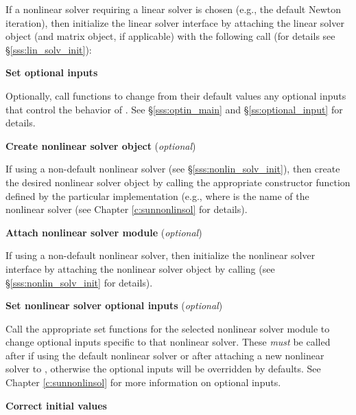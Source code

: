 \begin{Steps}
  If a nonlinear solver requiring a linear solver is chosen (e.g., the default
  Newton iteration), then initialize the {\idals} linear solver
  interface by attaching the linear solver object (and matrix object, if
  applicable) with the following call (for details see
  \S\ref{sss:lin_solv_init}):


\item
  {\bf Set optional inputs}

  Optionally, call  functions to change from their default values any
  optional inputs that control the behavior of {\idas}.
  See \S\ref{sss:optin_main} and \S\ref{ss:optional_input} for details.

\item\label{i:nonlin_solver}
  {\bf Create nonlinear solver object} (\textit{optional})

  If using a non-default nonlinear solver (see \S\ref{sss:nonlin_solv_init}),
  then create the desired nonlinear solver object by calling the appropriate
  constructor function defined by the particular {\sunnonlinsol} implementation
  (e.g.,  where \id{***} is the name of the
  nonlinear solver (see Chapter \ref{c:sunnonlinsol} for details).

\item\label{i:nonlin_solver_interface}
  {\bf Attach nonlinear solver module} (\textit{optional})

  If using a non-default nonlinear solver, then initialize the nonlinear solver
  interface by attaching the nonlinear solver object by calling
   (see
  \S\ref{sss:nonlin_solv_init} for details).

\item
  {\bf Set nonlinear solver optional inputs} (\textit{optional})

  Call the appropriate set functions for the selected nonlinear solver module to
  change optional inputs specific to that nonlinear solver. These \textit{must}
  be called after  if using the default nonlinear solver or after
  attaching a new nonlinear solver to {\idas}, otherwise the optional inputs will
  be overridden by {\idas} defaults. See Chapter \ref{c:sunnonlinsol} for more
  information on optional inputs.

\item
  {\bf Correct initial values}


\end{Steps}
